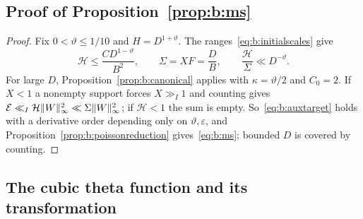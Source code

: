 \subsection{Proof of Proposition~\ref{prop:b:ms}}\label{ssec:b:completion}

\begin{proof}
Fix $0<\vartheta\le1/10$ and $H=D^{1+\vartheta}$. The ranges~\eqref{eq:b:initialscales} give
\[
  \mathcal H\le\frac{CD^{1-\vartheta}}{B^2},\qquad\Sigma=XF=\frac DB,\qquad\frac{\mathcal H}\Sigma\ll D^{-\vartheta}.
\]
For large $D$, Proposition~\ref{prop:b:canonical} applies with $\kappa=\vartheta/2$ and $C_0=2$. If $X<1$ a nonempty support forces $X\gg_I1$ and counting gives $\mathcal{E}\ll_I\mathcal H\|W\|_\infty^2\ll\Sigma\|W\|_\infty^2$; if $\mathcal H<1$ the sum is empty. So~\eqref{eq:b:auxtarget} holds with a derivative order depending only on $\vartheta,\varepsilon$, and Proposition~\ref{prop:b:poissonreduction} gives~\eqref{eq:b:ms}; bounded $D$ is covered by counting.
\end{proof}

\subsection{The cubic theta function and its transformation}\label{ssec:b:theta}

